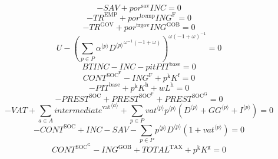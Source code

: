 \begin{equation}
-{S\!A\!V} + {{p\!o\!r}^{\mathrm{sav}}} {{I\!N\!C}} = 0
\end{equation}
\begin{equation}
-{T\!R}^{\mathrm{EMP}} + {{p\!o\!r}^{\mathrm{tremp}}} {{I\!N\!G}^{\mathrm{F}}} = 0
\end{equation}
\begin{equation}
-{T\!R}^{\mathrm{GOV}} + {{p\!o\!r}^{\mathrm{trgov}}} {{I\!N\!G}^{\mathrm{GOB}}} = 0
\end{equation}
\begin{equation}
U - \left(\sum_{p\in P} {{\alpha}^{\langle p\rangle}} {{{D}^{\langle p\rangle}}^{{\omega}^{-1} \left(-1 + \omega\right)}}\right)^{{\omega} \left(-1 + \omega\right)^{-1}} = 0
\end{equation}
\begin{equation}
{B\!T\!I\!N\!C} - {I\!N\!C} - {{p\!i\!t}} {{P\!I\!T}^{\mathrm{base}}} = 0
\end{equation}
\begin{equation}
{C\!O\!N\!T}^{\mathrm{SOC}^{\mathrm{F}}} - {I\!N\!G}^{\mathrm{F}} + {p^{\mathrm{k}}} {K^{\mathrm{f}}} = 0
\end{equation}
\begin{equation}
-{P\!I\!T}^{\mathrm{base}} + {p^{\mathrm{k}}} {K^{\mathrm{h}}} + {w} {L^{\mathrm{h}}} = 0
\end{equation}
\begin{equation}
-{P\!R\!E\!S\!T}^{\mathrm{SOC}} + {P\!R\!E\!S\!T}^{\mathrm{SOC}^{\mathrm{F}}} + {P\!R\!E\!S\!T}^{\mathrm{SOC}^{\mathrm{G}}} = 0
\end{equation}
\begin{equation}
-{V\!A\!T} + \sum_{a\in A} {{i\!n\!t\!e\!r\!m\!e\!d\!i\!a\!t\!e}^{\mathrm{vat}}}^{\langle a\rangle} + \sum_{p\in P} {{{v\!a\!t}}^{\langle p\rangle}} {{p}^{\langle p\rangle}} \left({D}^{\langle p\rangle} + {{G\!G}}^{\langle p\rangle} + {I}^{\langle p\rangle}\right) = 0
\end{equation}
\begin{equation}
-{C\!O\!N\!T}^{\mathrm{SOC}} + {I\!N\!C} - {S\!A\!V} - \sum_{p\in P} {{p}^{\langle p\rangle}} {{D}^{\langle p\rangle}} \left(1 + {{v\!a\!t}}^{\langle p\rangle}\right) = 0
\end{equation}
\begin{equation}
{C\!O\!N\!T}^{\mathrm{SOC}^{\mathrm{G}}} - {I\!N\!G}^{\mathrm{GOB}} + {T\!O\!T\!A\!L}^{\mathrm{TAX}} + {p^{\mathrm{k}}} {K^{\mathrm{g}}} = 0
\end{equation}
